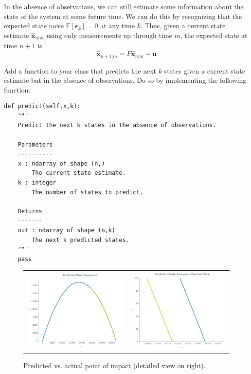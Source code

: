 In the absence of observations, we can still estimate some information about the state of the system at some future time.
We can do this by recognizing that the expected state noise $\mathbb{E}\left[\boldsymbol{\epsilon}_{k}\right] = 0$ at any time $k$.
Thus, given a current state estimate $\widehat{\mathbf{x}}_{n|m}$ using only measurements up through time $m$, the expected state at time $n+1$ is
\begin{equation*}
\widehat{\mathbf{x}}_{n+1|m} = F \widehat{\mathbf{x}}_{n|m} + \mathbf{u}
\end{equation*}

\begin{problem}
Add a function to your class that predicts the next $k$ states given a current state estimate but in the absence of observations.
Do so by implementing the following function:
\begin{lstlisting}
def predict(self,x,k):
    """
    Predict the next k states in the absence of observations.

    Parameters
    ----------
    x : ndarray of shape (n,)
        The current state estimate.
    k : integer
        The number of states to predict.

    Returns
    -------
    out : ndarray of shape (n,k)
        The next k predicted states.
    """
    pass
\end{lstlisting}
\end{problem}

\begin{figure}
    \centering
    \begin{tabular}{cc}
    \includegraphics[width=.45\textwidth]{figures/impact_macro} &
    \includegraphics[width=.45\textwidth]{figures/impact_micro}
    \end{tabular}
    \caption{Predicted vs. actual point of impact (detailed view on right).}
    \label{fig:impact}
\end{figure}

